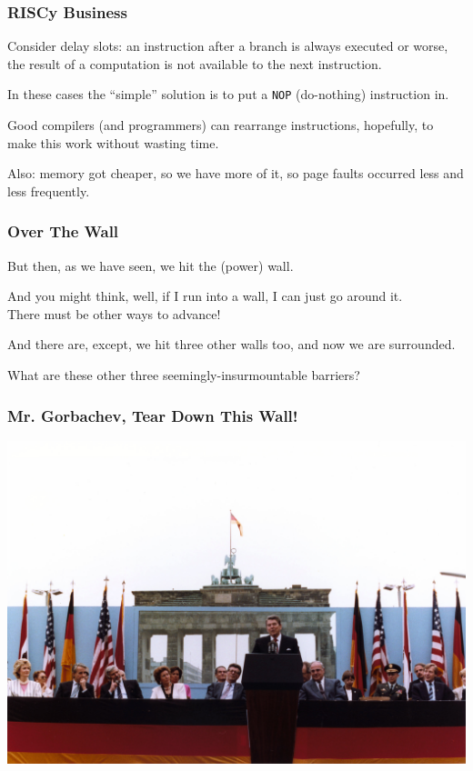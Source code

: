 \begin{frame}
\frametitle{RISCy Business}

Consider delay slots: an instruction after a branch is always executed or worse, the result of a computation is not available to the next instruction. 

In these cases the ``simple'' solution is to put a \texttt{NOP} (do-nothing) instruction in.

Good compilers (and programmers) can rearrange instructions, hopefully, to make this work without wasting time. 

Also: memory got cheaper, so we have more of it, so page faults occurred less and less frequently.


\end{frame}


\begin{frame}
\frametitle{Over The Wall}

But then, as we have seen, we hit the (power) wall. 

And you might think, well, if I run into a wall, I can just go around it.\\
\quad There must be other ways to advance! 

And there are, except, we hit three other walls too, and now we are surrounded.

What are these other three seemingly-insurmountable barriers?

\end{frame}

\begin{frame}
\frametitle{Mr. Gorbachev, Tear Down This Wall!}
\begin{center}
\includegraphics[width=\textwidth]{images/ReaganBerlinWall.jpg}
\end{center}
\end{frame}


